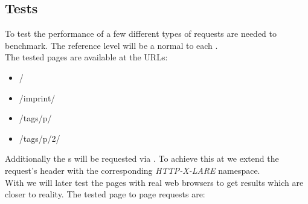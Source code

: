 \subsection{Tests}

To test the performance of \lare{} a few different types of requests are needed to benchmark.
The reference level will be a normal \httpRequest{} to each \webPage{}.
\\
The tested pages are available at the URLs:

\begin{itemize}
\item /
\item /imprint/
\item /tags/p/
\item /tags/p/2/
\end{itemize}

\noindent{}Additionally the \webPage{}s will be requested via \lare{}.
To achieve this at \curl{} we extend the request's header with the corresponding \emph{HTTP-X-LARE} namespace.
\\
With \selenium{} we will later test the pages with real web browsers to get results which are closer to reality.
The tested page to page requests are:

